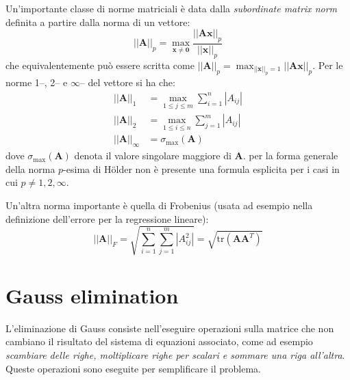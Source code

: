 \documentclass[10pt]{article}
\begin{document}
Un'importante classe di norme matriciali è data dalla \textit{subordinate matrix norm} definita a partire dalla norma di un vettore:
\begin{equation}
||\mathbf{A}||_p = \max_{\mathbf{x}\neq\mathbf{0}} \frac{||\mathbf{A}\mathbf{x}||_p}{||\mathbf{x}||_p}
\end{equation}
che equivalentemente può essere scritta come $||\mathbf{A}||_p = \max_{||\mathbf{x}||_p=1} ||\mathbf{A}\mathbf{x}||_p$.
Per le norme 1--, 2-- e $\infty$-- del vettore si ha che:
\begin{align}
||\mathbf{A}||_1 & = \max_{1\leq j\leq m} \sum_{i=1}^n |A_{ij}| \\
||\mathbf{A}||_2 & = \max_{1\leq i\leq n} \sum_{j=1}^m |A_{ij}| \\
||\mathbf{A}||_\infty & = \sigma_{\max}(\mathbf{A})
\end{align}
dove $\sigma_{\max}(\mathbf{A})$ denota il valore singolare maggiore di $\mathbf{A}$. per la forma generale della norma $p$-esima di H\"older non è presente una formula esplicita per i casi in cui $p\neq 1,2,\infty$.

Un'altra norma importante è quella di Frobenius (usata ad esempio nella definizione dell'errore per la regressione lineare):
\begin{equation}
||\mathbf{A}||_F = \sqrt{\sum_{i=1}^n \sum_{j=1}^m |A_{ij}^2|} = 
\sqrt{\text{tr}(\mathbf{A}\mathbf{A}^T)}
\end{equation}



\section{Gauss elimination}

L'eliminazione di Gauss consiste nell'eseguire operazioni sulla matrice che non cambiano il risultato del sistema di equazioni associato, come ad esempio \textit{scambiare delle righe, moltiplicare righe per scalari e sommare una riga all'altra}. Queste operazioni sono eseguite per semplificare il problema.
\end{document}
